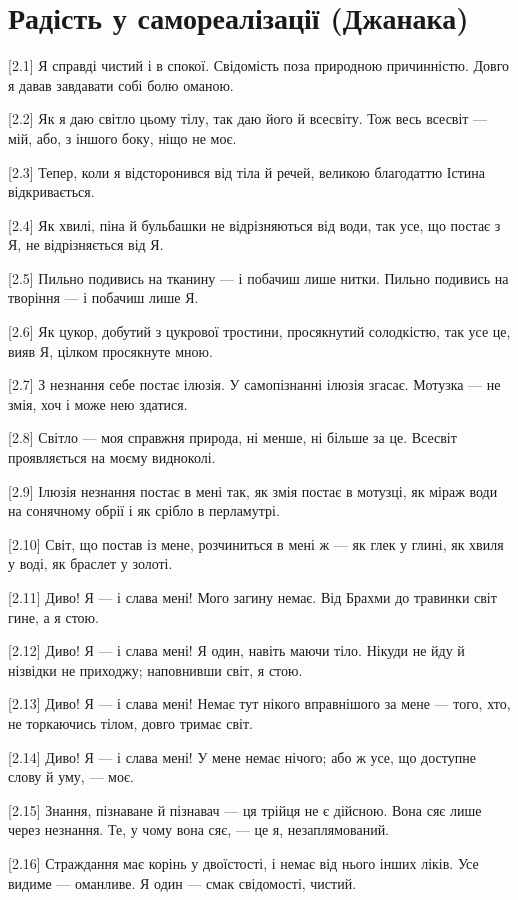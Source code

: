 \chapter[(Джанака)]{Радість у самореалізації (Джанака)}

[2.1] Я справді чистий і в спокої. Свідомість поза природною причинністю. Довго я давав завдавати собі болю оманою.

[2.2] Як я даю світло цьому тілу, так даю його й всесвіту. Тож весь всесвіт --- мій, або, з іншого боку, ніщо не моє.

[2.3] Тепер, коли я відсторонився від тіла й речей, великою благодаттю Істина відкривається.

[2.4] Як хвилі, піна й бульбашки не відрізняються від води, так усе, що постає з Я, не відрізняється від Я.

[2.5] Пильно подивись на тканину --- і побачиш лише нитки. Пильно подивись на творіння --- і побачиш лише Я.

[2.6] Як цукор, добутий з цукрової тростини, просякнутий солодкістю, так усе це, вияв Я, цілком просякнуте мною.

[2.7] З незнання себе постає ілюзія. У самопізнанні ілюзія згасає. Мотузка --- не змія, хоч і може нею здатися.

[2.8] Світло --- моя справжня природа, ні менше, ні більше за це. Всесвіт проявляється на моєму видноколі.

[2.9] Ілюзія незнання постає в мені так, як змія постає в мотузці, як міраж води на сонячному обрії і як срібло в перламутрі.

[2.10] Світ, що постав із мене, розчиниться в мені ж --- як глек у глині, як хвиля у воді, як браслет у золоті.

[2.11] Диво! Я --- і слава мені! Мого загину немає. Від Брахми до травинки світ гине, а я стою.

[2.12] Диво! Я --- і слава мені! Я один, навіть маючи тіло. Нікуди не йду й нізвідки не приходжу; наповнивши світ, я стою.

[2.13] Диво! Я --- і слава мені! Немає тут нікого вправнішого за мене --- того, хто, не торкаючись тілом, довго тримає світ.

[2.14] Диво! Я --- і слава мені! У мене немає нічого; або ж усе, що доступне слову й уму, --- моє.

[2.15] Знання, пізнаване й пізнавач --- ця трійця не є дійсною. Вона сяє лише через незнання. Те, у чому вона сяє, --- це я, незаплямований.

[2.16] Страждання має корінь у двоїстості, і немає від нього інших ліків. Усе видиме --- оманливе. Я один --- смак свідомості, чистий.

